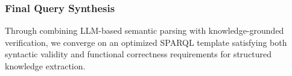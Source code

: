 \subsubsection{Final Query Synthesis} Through combining LLM-based semantic parsing with knowledge-grounded verification, we converge on an optimized SPARQL template satisfying both syntactic validity and functional correctness requirements for structured knowledge extraction.


